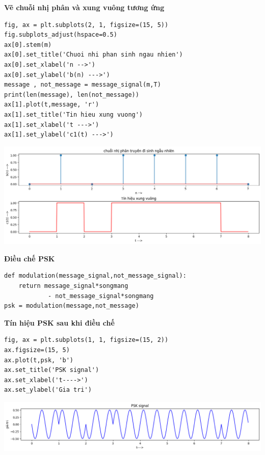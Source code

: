 \textbf{Vẽ chuỗi nhị phân và xung vuông tương ứng}
\begin{lstlisting}
fig, ax = plt.subplots(2, 1, figsize=(15, 5))               
fig.subplots_adjust(hspace=0.5)                           
ax[0].stem(m)                                          
ax[0].set_title('Chuoi nhi phan sinh ngau nhien')
ax[0].set_xlabel('n -->')
ax[0].set_ylabel('b(n) --->')
message , not_message = message_signal(m,T)                
print(len(message), len(not_message))
ax[1].plot(t,message, 'r')                                 
ax[1].set_title('Tin hieu xung vuong')
ax[1].set_xlabel('t --->')
ax[1].set_ylabel('c1(t) --->')
\end{lstlisting}
\begin{center}
     \includegraphics[scale=.5]{Img/vechuoinhiphantuognung.png}
\end{center}
\textbf{Điều chế PSK}
\begin{lstlisting}
def modulation(message_signal,not_message_signal):              
    return message_signal*songmang
            - not_message_signal*songmang  
psk = modulation(message,not_message)                              
\end{lstlisting}
\textbf{Tín hiệu PSK sau khi điều chế}
\begin{lstlisting}
fig, ax = plt.subplots(1, 1, figsize=(15, 2))    
ax.figsize=(15, 5)
ax.plot(t,psk, 'b')
ax.set_title('PSK signal')
ax.set_xlabel('t---->')
ax.set_ylabel('Gia tri')
\end{lstlisting}
\begin{center}
     \includegraphics[scale=.5]{Img/tinhieuPSKsaukhidieuche.png}
\end{center}
